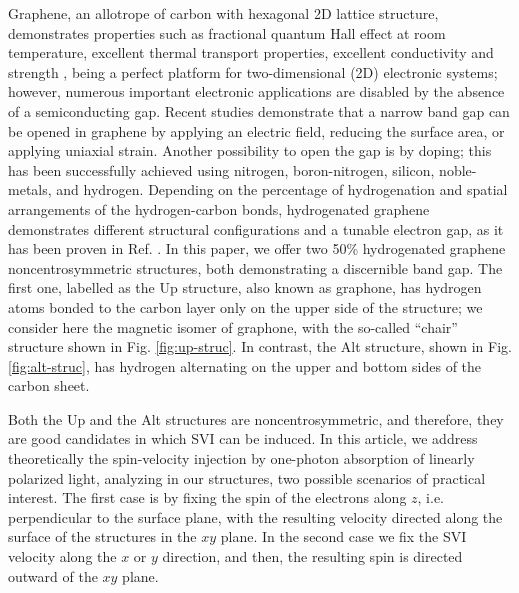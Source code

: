 \documentclass[floatfix,prb,aps,superscriptaddress,showpacs,11pt,preprint,letterpaper]{revtex4}
\begin{document}
Graphene, an allotrope of carbon with hexagonal 2D lattice structure,
demonstrates properties such as fractional quantum Hall effect at room
temperature, excellent thermal transport properties, excellent
conductivity\cite{heerscheNat07} and strength \cite{geimNM07, reinaNL08,
novoselov2S07, balandinNL08}, being a perfect platform  for two-dimensional (2D)
electronic systems; however, numerous important electronic applications are disabled by the
absence of a semiconducting gap. Recent studies demonstrate that a narrow band
gap  can be opened in graphene by applying an electric field,\cite{zhangN09}
reducing the surface area,\cite{hanPRL07} or applying uniaxial
strain.\cite{niACSN08} Another possibility to open the gap is by doping; this
has been successfully achieved using nitrogen,\cite{weiNL2009} 
boron-nitrogen,\cite{guoIJ11} silicon,\cite{colettiPRB10} 
noble-metals,\cite{varykhalovPRB10} and hydrogen.\cite{eliasS09, guisingerNL09,
samarakoonACSN10} Depending on the percentage of hydrogenation and spatial
arrangements of the hydrogen-carbon bonds, hydrogenated graphene demonstrates
different structural configurations and a tunable electron gap, as it has been
proven in Ref. . 
In this paper, we offer two 50\% hydrogenated graphene
noncentrosymmetric structures, both demonstrating a discernible band gap. The
first one, labelled as the Up structure, also known as
graphone,\cite{gmitraPRL13}  has
hydrogen atoms bonded to the carbon layer only on the upper side of the
structure; we consider here the magnetic isomer of graphone, with the so-called
``chair'' structure  shown in Fig. \ref{fig:up-struc}.
In contrast,  the Alt structure, shown in Fig. 
\ref{fig:alt-struc}, has hydrogen alternating on the upper and bottom sides of 
the carbon sheet.\cite{zapataPSB2016}

Both the Up and the Alt  structures
are noncentrosymmetric, and therefore,
they are good candidates in which SVI can be
induced. In this article, 
we address theoretically the spin-velocity injection
by one-photon absorption of linearly polarized light, analyzing
in our structures,
two possible scenarios of practical interest. 
The first case is by fixing the spin of the electrons along $z$, i.e. 
perpendicular 
to the surface plane, with the resulting velocity
directed along the surface of the
structures in the $xy$ plane. 
In the second case we fix the SVI velocity along the
$x$ or $y$ direction, and then, the resulting spin is directed outward of the
$xy$ plane. 
\end{document}
